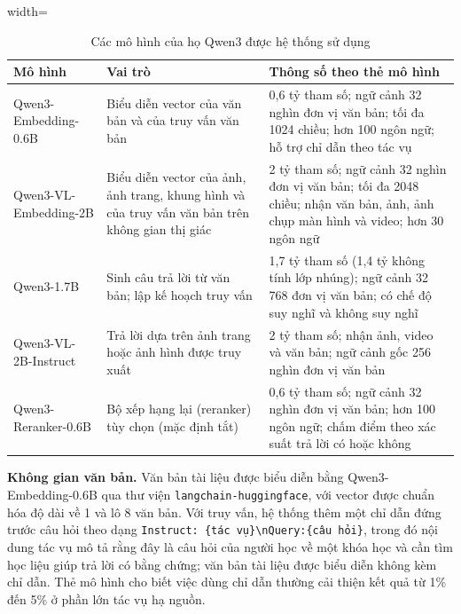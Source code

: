 \begin{table}[ht]
    \centering
    \caption{Các mô hình của họ Qwen3 được hệ thống sử dụng}
    \label{tab:models}
    \begin{adjustbox}{width=\textwidth}
    \begin{tabular}{|l|p{4.2cm}|p{6.4cm}|}
    \hline
    \textbf{Mô hình} & \textbf{Vai trò} & \textbf{Thông số theo thẻ mô hình} \\
    \hline
    Qwen3-Embedding-0.6B \cite{zhang2025qwen3embedding} & Biểu diễn vector của văn bản và của truy vấn văn bản & 0,6 tỷ tham số; ngữ cảnh 32 nghìn đơn vị văn bản; tối đa 1024 chiều; hơn 100 ngôn ngữ; hỗ trợ chỉ dẫn theo tác vụ \\
    \hline
    Qwen3-VL-Embedding-2B \cite{li2026qwen3vlembedding} & Biểu diễn vector của ảnh, ảnh trang, khung hình và của truy vấn văn bản trên không gian thị giác & 2 tỷ tham số; ngữ cảnh 32 nghìn đơn vị văn bản; tối đa 2048 chiều; nhận văn bản, ảnh, ảnh chụp màn hình và video; hơn 30 ngôn ngữ \\
    \hline
    Qwen3-1.7B \cite{yang2025qwen3} & Sinh câu trả lời từ văn bản; lập kế hoạch truy vấn & 1,7 tỷ tham số (1,4 tỷ không tính lớp nhúng); ngữ cảnh 32\,768 đơn vị văn bản; có chế độ suy nghĩ và không suy nghĩ \\
    \hline
    Qwen3-VL-2B-Instruct \cite{bai2025qwen3vl} & Trả lời dựa trên ảnh trang hoặc ảnh hình được truy xuất & 2 tỷ tham số; nhận ảnh, video và văn bản; ngữ cảnh gốc 256 nghìn đơn vị văn bản \\
    \hline
    Qwen3-Reranker-0.6B \cite{zhang2025qwen3embedding} & Bộ xếp hạng lại (reranker) tùy chọn (mặc định tắt) & 0,6 tỷ tham số; ngữ cảnh 32 nghìn đơn vị văn bản; hơn 100 ngôn ngữ; chấm điểm theo xác suất trả lời có hoặc không \\
    \hline
    \end{tabular}
    \end{adjustbox}
\end{table}

\bigbreak\noindent
\textbf{Không gian văn bản.} Văn bản tài liệu được biểu diễn bằng Qwen3-Embedding-0.6B qua thư viện \texttt{langchain-huggingface}, với vector được chuẩn hóa độ dài về 1 và lô 8 văn bản. Với truy vấn, hệ thống thêm một chỉ dẫn đứng trước câu hỏi theo dạng \texttt{Instruct: \{tác vụ\}\textbackslash nQuery:\{câu hỏi\}}, trong đó nội dung tác vụ mô tả rằng đây là câu hỏi của người học về một khóa học và cần tìm học liệu giúp trả lời có bằng chứng; văn bản tài liệu được biểu diễn không kèm chỉ dẫn. Thẻ mô hình cho biết việc dùng chỉ dẫn thường cải thiện kết quả từ 1\% đến 5\% ở phần lớn tác vụ hạ nguồn.

